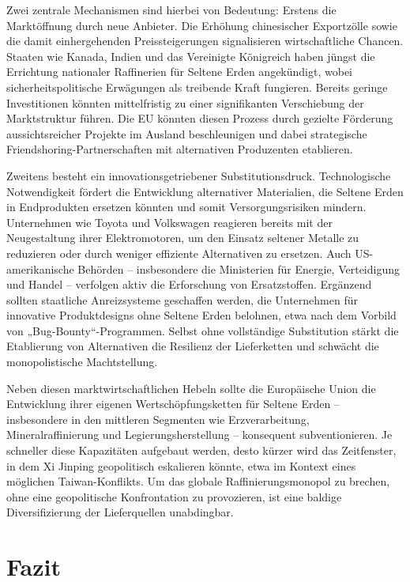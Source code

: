 \documentclass[12pt,a4paper,oneside]{book} %
\begin{document}
Zwei zentrale Mechanismen sind hierbei von Bedeutung: Erstens die Marktöffnung durch neue Anbieter. Die Erhöhung chinesischer Exportzölle sowie die damit einhergehenden Preissteigerungen signalisieren wirtschaftliche Chancen. Staaten wie Kanada, Indien und das Vereinigte Königreich haben jüngst die Errichtung nationaler Raffinerien für Seltene Erden angekündigt, wobei sicherheitspolitische Erwägungen als treibende Kraft fungieren. Bereits geringe Investitionen könnten mittelfristig zu einer signifikanten Verschiebung der Marktstruktur führen. Die EU könnten diesen Prozess durch gezielte Förderung aussichtsreicher Projekte im Ausland beschleunigen und dabei strategische Friendshoring-Partnerschaften mit alternativen Produzenten etablieren.

Zweitens besteht ein innovationsgetriebener Substitutionsdruck. Technologische Notwendigkeit fördert die Entwicklung alternativer Materialien, die Seltene Erden in Endprodukten ersetzen könnten und somit Versorgungsrisiken mindern. Unternehmen wie Toyota und Volkswagen reagieren bereits mit der Neugestaltung ihrer Elektromotoren, um den Einsatz seltener Metalle zu reduzieren oder durch weniger effiziente Alternativen zu ersetzen. Auch US-amerikanische Behörden – insbesondere die Ministerien für Energie, Verteidigung und Handel – verfolgen aktiv die Erforschung von Ersatzstoffen. Ergänzend sollten staatliche Anreizsysteme geschaffen werden, die Unternehmen für innovative Produktdesigns ohne Seltene Erden belohnen, etwa nach dem Vorbild von „Bug-Bounty“-Programmen. Selbst ohne vollständige Substitution stärkt die Etablierung von Alternativen die Resilienz der Lieferketten und schwächt die monopolistische Machtstellung.

Neben diesen marktwirtschaftlichen Hebeln sollte die Europäische Union die Entwicklung ihrer eigenen Wertschöpfungsketten für Seltene Erden – insbesondere in den mittleren Segmenten wie Erzverarbeitung, Mineralraffinierung und Legierungsherstellung – konsequent subventionieren. Je schneller diese Kapazitäten aufgebaut werden, desto kürzer wird das Zeitfenster, in dem Xi Jinping geopolitisch eskalieren könnte, etwa im Kontext eines möglichen Taiwan-Konflikts. Um das globale Raffinierungsmonopol zu brechen, ohne eine geopolitische Konfrontation zu provozieren, ist eine baldige Diversifizierung der Lieferquellen unabdingbar.

\section{Fazit}
\end{document}
